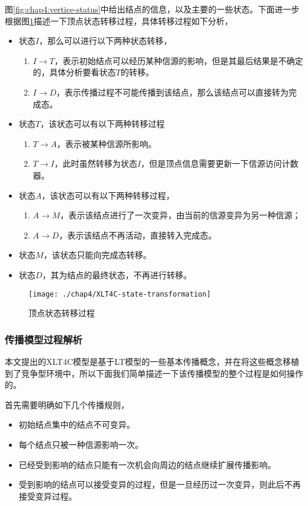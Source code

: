 图\ref{fig:chap4:vertice-status}中给出结点的信息，以及主要的一些状态。下面进一步根据图\ref{fig:chap4:state-xformation}描述一下顶点状态转移过程，具体转移过程如下分析，
\begin{itemize}
\item 状态$I$，那么可以进行以下两种状态转移，
	\begin{enumerate}
	\item $I \rightarrow T$，表示初始结点可以经历某种信源的影响，但是其最后结果是不确定的，具体分析要看状态$T$的转移。
	\item $I \rightarrow D$，表示传播过程不可能传播到该结点，那么该结点可以直接转为完成态。
	\end{enumerate}
\item 状态$T$，该状态可以有以下两种转移过程
	\begin{enumerate}
	\item $T \rightarrow A$，表示被某种信源所影响。
	\item $T \rightarrow I$，此时虽然转移为状态$I$，但是顶点信息需要更新一下信源访问计数器。
	\end{enumerate}
\item 状态$A$，该状态可以有以下两种转移过程，
	\begin{enumerate}
	\item $A \rightarrow M$，表示该结点进行了一次变异，由当前的信源变异为另一种信源；
	\item $A \rightarrow D$，表示该结点不再活动，直接转入完成态。
	\end{enumerate}
\item 状态$M$，该状态只能向完成态转移。
\item 状态$D$，其为结点的最终状态，不再进行转移。
\end{itemize}

\begin{figure}[H]
	\centering%
	\texttt{[image: ./chap4/XLT4C-state-transformation]}
	\caption{顶点状态转移过程}
	\label{fig:chap4:state-xformation}
\end{figure}


\subsubsection{传播模型过程解析}
\label{sec:xlt4c:model-analysis}
本文提出的XLT4C模型是基于LT模型的一些基本传播概念，并在将这些概念移植到了竞争型环境中，所以下面我们简单描述一下该传播模型的整个过程是如何操作的。

首先需要明确如下几个传播规则，
\begin{itemize}
\label{list:rules-for-xtran}
\item 初始结点集中的结点不可变异。
\item 每个结点只被一种信源影响一次。
\item 已经受到影响的结点只能有一次机会向周边的结点继续扩展传播影响。
\item 受到影响的结点可以接受变异的过程，但是一旦经历过一次变异，则此后不再接受变异过程。
\end{itemize}


